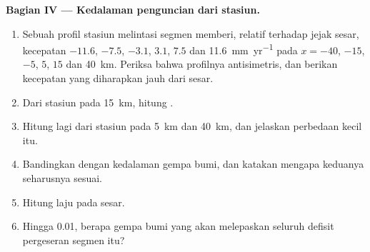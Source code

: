 \begin{problem}
\medskip
\noindent\textbf{Bagian IV --- Kedalaman penguncian dari stasiun.}
\begin{enumerate}[resume]
  \item Sebuah profil stasiun melintasi segmen memberi, relatif terhadap jejak sesar, kecepatan $-11.6$, $-7.5$, $-3.1$, $3.1$, $7.5$ dan \qty{11.6}{mm.yr^{-1}} pada $x = -40$, $-15$, $-5$, $5$, $15$ dan \qty{40}{km}. Periksa bahwa profilnya antisimetris, dan berikan kecepatan yang diharapkan jauh dari sesar.
  \item Dari stasiun pada \qty{15}{km}, hitung .
  \item Hitung lagi dari stasiun pada \qty{5}{km} dan \qty{40}{km}, dan jelaskan perbedaan kecil itu.
  \item Bandingkan  dengan kedalaman gempa bumi, dan katakan mengapa keduanya seharusnya sesuai.
  \item Hitung laju  pada sesar.
  \item Hingga 0.01, berapa  gempa bumi yang akan melepaskan seluruh defisit pergeseran segmen itu?
\end{enumerate}
\end{problem}
